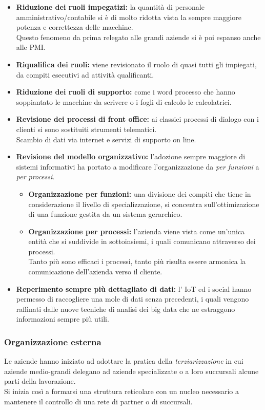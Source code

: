\documentclass[../main.tex]{subfiles}
\begin{document}
	\begin{itemize}
		\item \textbf{Riduzione dei ruoli impegatizi:} la quantità di personale amministrativo/contabile si è di molto ridotta vista la sempre maggiore potenza e correttezza delle macchine.\\
			Questo fenomeno da prima relegato alle grandi aziende si è poi espanso anche alle PMI.
		\item \textbf{Riqualifica dei ruoli:} viene revisionato il ruolo di quasi tutti gli impiegati, da compiti esecutivi ad attività qualificanti.
		\item \textbf{Riduzione dei ruoli di supporto:} come i word processo che hanno soppiantato le macchine da scrivere o i fogli di calcolo le calcolatrici.
		\item \textbf{Revisione dei processi di front office:} ai classici processi di dialogo con i clienti si sono sostituiti strumenti telematici.\\
			Scambio di dati via internet e servizi di supporto on line.
		\item \textbf{Revisione del modello organizzativo:} l'adozione sempre maggiore di sistemi informativi ha portato a modificare l'organizzazione da \emph{per funzioni} a \emph{per processi}.
		\begin{itemize}
			\item \textbf{Organizzazione per funzioni:} una divisione dei compiti che tiene in considerazione il livello di specializzazione, si concentra sull'ottimizazione di una funzione gestita da un sistema gerarchico.
			\item \textbf{Organizzazione per processi:} l'azienda viene vista come un'unica entità che si suddivide in sottoinsiemi, i quali comunicano attraverso dei processi.\\
				Tanto più sono efficaci i processi, tanto più risulta essere armonica la comunicazione dell'azienda verso il cliente.
		\end{itemize}
		\item \textbf{Reperimento sempre più dettagliato di dati:} l' IoT ed i social hanno permesso di raccogliere una mole di dati senza precedenti, i quali vengono raffinati dalle nuove tecniche di analisi dei big data che ne estraggono informazioni sempre più utili.
	\end{itemize}
	\subsubsection{Organizzazione esterna}
	Le aziende hanno iniziato ad adottare la pratica della \emph{terziarizzazione} in cui aziende medio-grandi delegano ad aziende specializzate o a loro succursali alcune parti della lavorazione.\\
	Si inizia così a formarsi una struttura reticolare con un nucleo necessario a mantenere il controllo di una rete di partner o di succursali.
\end{document}
